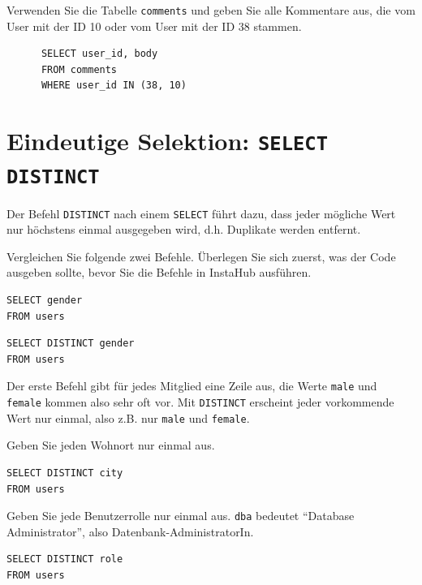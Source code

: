 \begin{myexercise}
  Verwenden Sie die Tabelle \texttt{comments} und geben Sie alle Kommentare aus, die vom User mit der ID 10 oder vom User mit der ID 38 stammen.
  \begin{myanswer}
    \begin{lstlisting}
      SELECT user_id, body
      FROM comments
      WHERE user_id IN (38, 10)
\end{lstlisting}
  \end{myanswer}
\end{myexercise}


\section{Eindeutige Selektion: \texorpdfstring{\lstinline|SELECT DISTINCT|}{SELECT DISTINCT}}

Der Befehl \lstinline|DISTINCT| nach einem \lstinline|SELECT| führt dazu, dass jeder mögliche Wert
nur höchstens einmal ausgegeben wird, d.h. Duplikate werden entfernt.

\begin{myexercise}
  Vergleichen Sie folgende zwei Befehle. Überlegen Sie sich zuerst, was der Code ausgeben sollte, bevor Sie die Befehle in InstaHub ausführen.

 \begin{lstlisting}
SELECT gender
FROM users
\end{lstlisting}

  \begin{lstlisting}
SELECT DISTINCT gender
FROM users
\end{lstlisting}
  \begin{myanswer}
    Der erste Befehl gibt für jedes Mitglied eine Zeile aus, die Werte \texttt{male} und \texttt{female} kommen also sehr oft vor. Mit \lstinline|DISTINCT| erscheint jeder vorkommende Wert nur einmal, also z.B. nur \texttt{male} und \texttt{female}.
  \end{myanswer}
\end{myexercise}

\begin{myexercise}
  Geben Sie jeden Wohnort nur einmal aus.
  \begin{myanswer}
    \begin{lstlisting}
SELECT DISTINCT city
FROM users
\end{lstlisting}
  \end{myanswer}
\end{myexercise}
\begin{myexercise}
  Geben Sie jede Benutzerrolle nur einmal aus. \texttt{dba} bedeutet \enquote{Database Administrator}, also Datenbank-AdministratorIn.
  \begin{myanswer}
    \begin{lstlisting}
SELECT DISTINCT role
FROM users
\end{lstlisting}
  \end{myanswer}
\end{myexercise}



